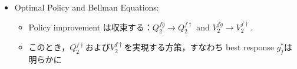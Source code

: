 \documentclass[a4paper,10pt,dvipdfmx]{jsarticle}
\begin{document}
\begin{itemize}
\begin{proof}
\begin{align}
            &=\beta\mathcal{H}^g(s)+\beta\int_{\mathcal{B}}g(b|s)\log\dfrac{\exp\left(\beta^{-1}\bar{Q}_2^{fg}(s,b)\right)}{Z^{fg}(s)}\rmd b + \beta\log Z^{fg}(s)\\
            &=-\beta\int_{\mathcal{B}}g(b|s)\log\dfrac{g(b|s)}{g'(b|s)}\rmd b+\beta\log Z^{fg}(s)\\
            &=-\beta \mathrm{D_{KL}}(g(\cdot|s)||g'(\cdot|s))+\beta\log Z^{fg}(s)
        \end{align}
        \begin{align}
            &\therefore \beta\mathcal{H}^{g'}(s)+\E_{b\sim g'}\left[\bar{Q}_2^{fg}(s,b)\right]=\beta\log Z^{fg}(s)\\
            &\therefore \beta\mathcal{H}^{g'}(s)+\E_{b\sim g'}\left[\bar{Q}_2^{fg}(s,b)\right]\ge \beta\mathcal{H}^{g}(s)+\E_{b\sim g}\left[\bar{Q}_2^{fg}(s,b)\right]
        \end{align}
        \begin{align}
            Q_2^{fg}(s,a,b)&=r_2(s,a,b)+\gamma_2\E_{s'}\left[\beta\mathcal{H}^g(s')+\E_{b'\sim g}\left[\bar{Q}_2^{fg}(s',b')\right]\right]\\
            &\le r_2(s,a,b)+\gamma_2\E_{s'}\left[\beta\mathcal{H}^{g'}(s')+\E_{b'\sim g'}\left[\bar{Q}_2^{fg}(s',b')\right]\right]\\
            &\vdots\\
            &\le Q_2^{fg'}(s,a,b)
        \end{align}
        \begin{align}
            V_2^{fg}(s)&=\beta\mathcal{H}^g(s)+\E_{b\sim g}\left[\bar{Q}_2^{fg}(s,b)\right]\\
            &\le\beta\mathcal{H}^{g'}(s)+\E_{b\sim g'}\left[\bar{Q}_2^{fg}(s,b)\right]\\
            &=\beta\mathcal{H}^{g'}(s)+\E_{b\sim g'}\E_{a\sim f}\left[r_2(s,a,b)+\gamma_2\E_{s'}\left[V_2^{fg}(s')\right]\right]\\
            &\vdots\\
            &\le V_2^{fg'}(s)
        \end{align}
    \end{proof}
    \item Optimal Policy and Bellman Equations:
    \begin{itemize}
        \item Policy improvement は収束する：$Q_2^{fg}\to Q_2^{f\dag}$ and $V_2^{fg}\to V_2^{f\dag}$.
        \item このとき，$Q_2^{f\dag}$および$V_2^{f\dag}$を実現する方策，すなわち best response $g_f^*$は明らかに

\end{itemize}
\end{itemize}
\end{document}
